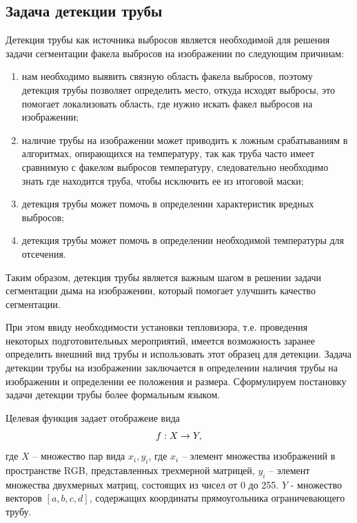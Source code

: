 \documentclass[14pt, a4paper]{extreport}
\begin{document}
\subsection{Задача детекции трубы}
	Детекция трубы как источника выбросов является необходимой для решения задачи сегментации факела выбросов на изображении по следующим причинам:
	\begin{enumerate}[label={\arabic*)}]
		\item нам необходимо выявить связную область факела выбросов, поэтому детекция трубы позволяет определить место, откуда исходят выбросы, это помогает локализовать область, где нужно искать факел выбросов на изображении;
		\item наличие трубы на изображении может приводить к ложным срабатываниям в алгоритмах, опирающихся на температуру, так как труба часто имеет сравнимую с факелом выбросов температуру, следовательно необходимо знать где находится труба, чтобы исключить ее из итоговой маски;
		\item детекция трубы может помочь в определении характеристик вредных выбросов; 
		\item детекция трубы может помочь в определении необходимой температуры для отсечения. 
	\end{enumerate}
	Таким образом, детекция трубы является важным шагом в решении задачи сегментации дыма на изображении, который помогает улучшить качество сегментации.
	
	При этом ввиду необходимости установки тепловизора, т.е. проведения некоторых подготовительных мероприятий, имеется возможность заранее определить внешний вид трубы и использовать этот образец для детекции. Задача детекции трубы на изображении заключается в определении наличия трубы на изображении и определении ее положения и размера. Сформулируем постановку задачи детекции трубы более формальным языком.
	
	Целевая функция задает отображеие вида
	\vspace*{-0.2cm}
	\begin{equation}
		f : X \rightarrow Y,
		\label{f:x->[4]}
		\vspace*{-0.4cm}
	\end{equation}
	где $X$ -- множество пар вида $x_i, y_i$, где $x_i$ -- элемент множества изображений в пространстве RGB, представленных трехмерной матрицей, $y_i$ -- элемент множества двухмерных матриц, состоящих из чисел от 0 до 255. $Y$ - множество векторов $[a, b, c, d]$, содержащих координаты прямоугольника ограничевающего трубу. 
	
\end{document}

